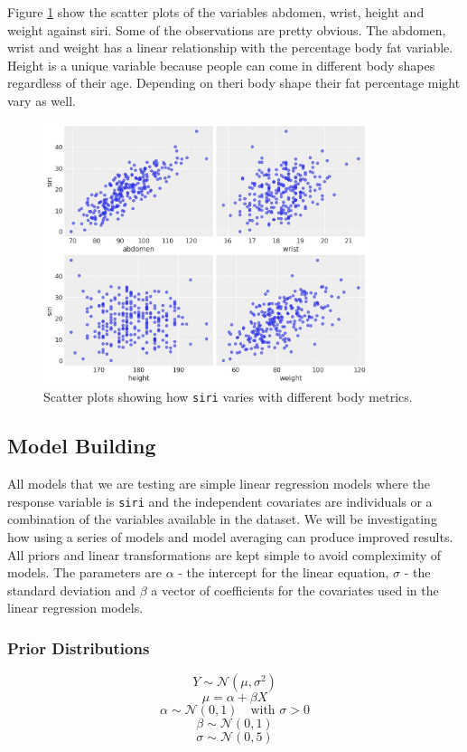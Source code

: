 \documentclass[12 pt]{scrartcl}
\begin{document}
	Figure \ref{fig:siri_scatterplots} show the scatter plots of the variables abdomen, wrist, height and weight against siri. Some of the observations are pretty obvious. The abdomen, wrist and weight has a linear relationship with the percentage body fat variable. Height is a unique variable because people can come in different body shapes regardless of their age. Depending on theri body shape their fat percentage might vary as well.
	\begin{figure}[h!] 
		\centering
		\includegraphics[width=0.85\textwidth]{Figures/1.jpeg}
		\caption{Scatter plots showing how \texttt{siri} varies with different body metrics.}
		\label{fig:siri_scatterplots}
	\end{figure}
	
	\subsection{Model Building}
	All models that we are testing are simple linear regression models where the response variable is \texttt{siri} and the independent covariates are individuals or a combination of the variables available in the dataset. We will be investigating how using a series of models and model averaging can produce improved results. All priors and linear transformations are kept simple to avoid compleximity of models. The parameters are \texttt{$\alpha$} - the intercept for the linear equation, \texttt{$\sigma$} - the standard deviation and \texttt{$\beta$} a vector of coefficients for the covariates used in the linear regression models.
	
	\subsubsection{Prior Distributions}
	\[Y \sim \mathcal{N}(\mu, \sigma^2) \]
	\[\mu = \alpha + \beta X\]
	\[\alpha \sim \mathcal{N}(0, 1)  \quad \text{with } \sigma > 0\]
	\[\beta \sim \mathcal{N}(0, 1)\]
	\[\sigma \sim \mathcal{N}(0, 5)\]
	
\end{document}
